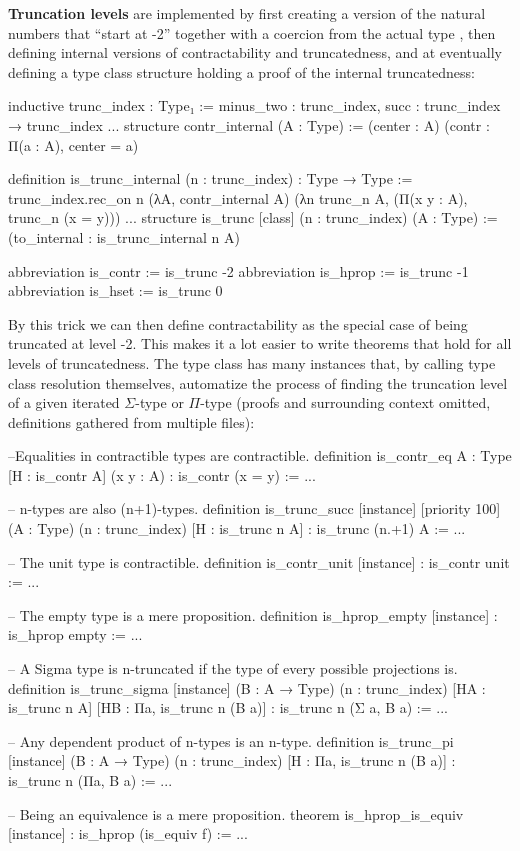 \textbf{Truncation levels} are implemented by first creating a version of the natural
numbers that ``start at -2'' together with a coercion from the actual type
, then defining internal versions of contractability and truncatedness,
and at eventually defining a type class structure holding a proof of the internal
truncatedness:
\begin{leancodebr}
inductive trunc_index : Type₁ :=
  minus_two : trunc_index,
  succ : trunc_index → trunc_index
...
structure contr_internal (A : Type) :=
  (center : A)
  (contr : Π(a : A), center = a)

definition is_trunc_internal (n : trunc_index) : Type → Type :=
trunc_index.rec_on n (λA, contr_internal A)
  (λn trunc_n A, (Π(x y : A), trunc_n (x = y)))
...
structure is_trunc [class] (n : trunc_index) (A : Type) :=
  (to_internal : is_trunc_internal n A)

abbreviation is_contr := is_trunc -2
abbreviation is_hprop := is_trunc -1
abbreviation is_hset  := is_trunc 0
\end{leancodebr}
By this trick we can then define contractability as the special case of being 
truncated at level -2.
This makes it a lot easier to write theorems that hold for all levels of
truncatedness.
The type class  has many instances that, by calling type class
resolution themselves, automatize the process of finding the truncation level
of a given iterated $\Sigma$-type or $\Pi$-type (proofs and surrounding
context omitted, definitions gathered from multiple files):
\begin{leancode}
--Equalities in contractible types are contractible.
definition is_contr_eq {A : Type} [H : is_contr A] (x y : A) :
  is_contr (x = y) := ...

-- n-types are also (n+1)-types.
definition is_trunc_succ [instance] [priority 100] 
  (A : Type) (n : trunc_index) [H : is_trunc n A] : is_trunc (n.+1) A := ...

-- The unit type is contractible.
definition is_contr_unit [instance] : is_contr unit := ...

-- The empty type is a mere proposition.
definition is_hprop_empty [instance] : is_hprop empty := ...

-- A Sigma type is n-truncated if the type of every possible projections is.
definition is_trunc_sigma [instance] (B : A → Type) (n : trunc_index)
  [HA : is_trunc n A] [HB : Πa, is_trunc n (B a)] :
  is_trunc n (Σ a, B a) := ...
  
-- Any dependent product of n-types is an n-type.
definition is_trunc_pi [instance] (B : A → Type) (n : trunc_index)
  [H : Πa, is_trunc n (B a)] : is_trunc n (Πa, B a) := ...
  
-- Being an equivalence is a mere proposition.
theorem is_hprop_is_equiv [instance] : is_hprop (is_equiv f) := ...
\end{leancode}


